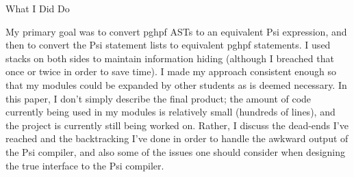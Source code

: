What I Did Do

My primary goal was to convert pghpf ASTs to an equivalent Psi expression,
and then to convert the Psi statement lists to equivalent pghpf statements.
I used stacks on both sides to maintain information hiding (although I
breached that once or twice in order to save time).  I made my approach
consistent enough so that my modules could be expanded by other students
as is deemed necessary.  In this paper, I don't simply describe the final
product; the amount of code currently being used in my modules is relatively
small (hundreds of lines), and the project is currently still being worked on.
Rather, I discuss the dead-ends I've reached and the backtracking I've done in
order to handle the awkward output of the Psi compiler, and also some of the
issues one should consider when designing the true interface to the Psi
compiler.
